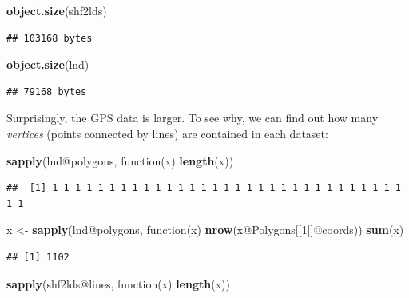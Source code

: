 \documentclass[]{article}
\newenvironment{Shaded}{}{}
\newcommand{\KeywordTok}[1]{\textcolor[rgb]{0.00,0.44,0.13}{\textbf{{#1}}}}
\newcommand{\DecValTok}[1]{\textcolor[rgb]{0.25,0.63,0.44}{{#1}}}
\newcommand{\StringTok}[1]{\textcolor[rgb]{0.25,0.44,0.63}{{#1}}}
\newcommand{\NormalTok}[1]{{#1}}
\begin{document}
\begin{Shaded}
\begin{Highlighting}[]
\KeywordTok{object.size}\NormalTok{(shf2lds)}
\end{Highlighting}
\end{Shaded}

\begin{verbatim}
## 103168 bytes
\end{verbatim}

\begin{Shaded}
\begin{Highlighting}[]
\KeywordTok{object.size}\NormalTok{(lnd)}
\end{Highlighting}
\end{Shaded}

\begin{verbatim}
## 79168 bytes
\end{verbatim}

Surprisingly, the GPS data is larger. To see why, we can find out how
many \emph{vertices} (points connected by lines) are contained in each
dataset:

\begin{Shaded}
\begin{Highlighting}[]
\KeywordTok{sapply}\NormalTok{(lnd@polygons, function(x) }\KeywordTok{length}\NormalTok{(x))}
\end{Highlighting}
\end{Shaded}

\begin{verbatim}
##  [1] 1 1 1 1 1 1 1 1 1 1 1 1 1 1 1 1 1 1 1 1 1 1 1 1 1 1 1 1 1 1 1 1 1
\end{verbatim}

\begin{Shaded}
\begin{Highlighting}[]
\NormalTok{x <-}\StringTok{ }\KeywordTok{sapply}\NormalTok{(lnd@polygons, function(x) }\KeywordTok{nrow}\NormalTok{(x@Polygons[[}\DecValTok{1}\NormalTok{]]@coords))}
\KeywordTok{sum}\NormalTok{(x)}
\end{Highlighting}
\end{Shaded}

\begin{verbatim}
## [1] 1102
\end{verbatim}

\begin{Shaded}
\begin{Highlighting}[]

\KeywordTok{sapply}\NormalTok{(shf2lds@lines, function(x) }\KeywordTok{length}\NormalTok{(x))}
\end{Highlighting}
\end{Shaded}
\end{document}
